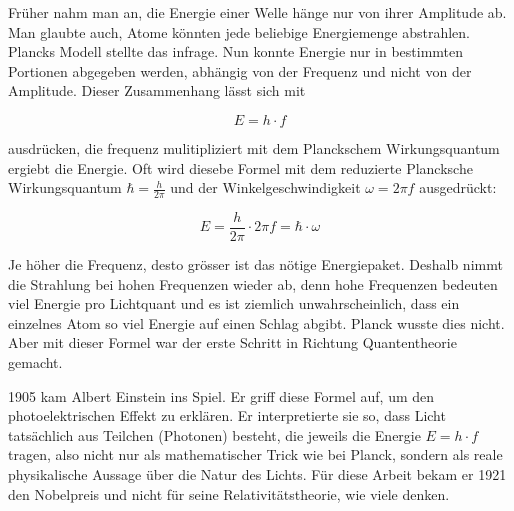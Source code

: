	
	Früher nahm man an, die Energie einer Welle hänge nur von ihrer Amplitude ab. 
	Man glaubte auch, Atome könnten jede beliebige Energiemenge abstrahlen. 
	Plancks Modell stellte das infrage. 
	Nun konnte Energie nur in bestimmten Portionen abgegeben werden, abhängig von der Frequenz und nicht von der Amplitude. 
	Dieser Zusammenhang lässt sich mit  
	
	\begin{equation}
		E = h \cdot f
	\end{equation}
	
	 ausdrücken, die frequenz mulitipliziert mit dem Planckschem Wirkungsquantum ergiebt die Energie.
	 Oft wird diesebe Formel mit dem reduzierte Plancksche Wirkungsquantum $\hbar = \frac{h}{2\pi}$ und der Winkelgeschwindigkeit $\omega = 2 \pi f$ ausgedrückt:
	 
	 \begin{equation}
	  	E = \frac{h}{2\pi} \cdot 2\pi f = \hbar \cdot \omega
	 \end{equation}
	 
	 
	Je höher die Frequenz, desto grösser ist das nötige Energiepaket. 
	Deshalb nimmt die Strahlung bei hohen Frequenzen wieder ab, denn hohe Frequenzen bedeuten viel Energie pro Lichtquant und es ist ziemlich unwahrscheinlich, dass ein einzelnes Atom so viel Energie auf einen Schlag abgibt. 
	Planck wusste dies nicht. 
	Aber mit dieser Formel war der erste Schritt in Richtung  Quantentheorie gemacht.

	
	
	
	1905 kam Albert Einstein ins Spiel. 
	Er griff diese Formel auf, um den photoelektrischen Effekt zu erklären. 
	Er interpretierte sie so, dass Licht tatsächlich aus Teilchen (Photonen) besteht, die jeweils die Energie $E = h \cdot f$ tragen, also nicht nur als mathematischer Trick wie bei Planck, sondern als reale physikalische Aussage über die Natur des Lichts.
	Für diese Arbeit bekam er 1921 den Nobelpreis und nicht für seine Relativitätstheorie, wie viele denken.
	
	 
	
	

